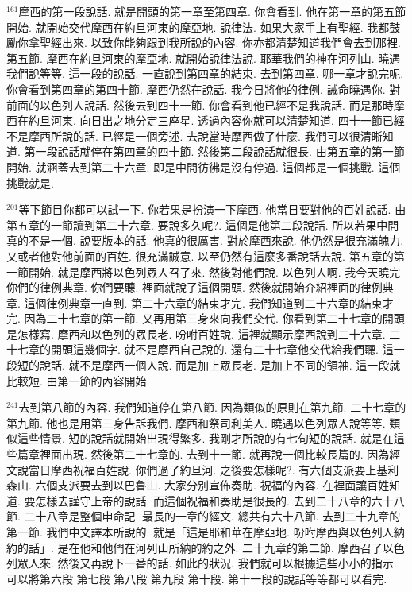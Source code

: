 \documentclass{book}
\begin{document}
$^{161}$摩西的第一段說話.
就是開頭的第一章至第四章.
你會看到.
他在第一章的第五節開始.
就開始交代摩西在約旦河東的摩亞地.
說律法.
如果大家手上有聖經.
我都鼓勵你拿聖經出來.
以致你能夠跟到我所說的內容.
你亦都清楚知道我們會去到那裡.
第五節.
摩西在約旦河東的摩亞地.
就開始說律法說.
耶華我們的神在河列山.
曉遇我們說等等.
這一段的說話.
一直說到第四章的結束.
去到第四章.
哪一章才說完呢.
你會看到第四章的第四十節.
摩西仍然在說話.
我今日將他的律例.
誡命曉遇你.
對前面的以色列人說話.
然後去到四十一節.
你會看到他已經不是我說話.
而是那時摩西在約旦河東.
向日出之地分定三座星.
透過內容你就可以清楚知道.
四十一節已經不是摩西所說的話.
已經是一個旁述.
去說當時摩西做了什麼.
我們可以很清晰知道.
第一段說話就停在第四章的四十節.
然後第二段說話就很長.
由第五章的第一節開始.
就涵蓋去到第二十六章.
即是中間彷彿是沒有停過.
這個都是一個挑戰.
這個挑戰就是.

$^{201}$等下節目你都可以試一下.
你若果是扮演一下摩西.
他當日要對他的百姓說話.
由第五章的一節讀到第二十六章.
要說多久呢?.
這個是他第二段說話.
所以若果中間真的不是一個.
說要版本的話.
他真的很厲害.
對於摩西來說.
他仍然是很充滿魄力.
又或者他對他前面的百姓.
很充滿誠意.
以至仍然有這麼多番說話去說.
第五章的第一節開始.
就是摩西將以色列眾人召了來.
然後對他們說.
以色列人啊.
我今天曉完你們的律例典章.
你們要聽.
裡面就說了這個開頭.
然後就開始介紹裡面的律例典章.
這個律例典章一直到.
第二十六章的結束才完.
我們知道到二十六章的結束才完.
因為二十七章的第一節.
又再用第三身來向我們交代.
你看到第二十七章的開頭是怎樣寫.
摩西和以色列的眾長老.
吩咐百姓說.
這裡就顯示摩西說到二十六章.
二十七章的開頭這幾個字.
就不是摩西自己說的.
還有二十七章他交代給我們聽.
這一段短的說話.
就不是摩西一個人說.
而是加上眾長老.
是加上不同的領袖.
這一段就比較短.
由第一節的內容開始.

$^{241}$去到第八節的內容.
我們知道停在第八節.
因為類似的原則在第九節.
二十七章的第九節.
他也是用第三身告訴我們.
摩西和祭司利美人.
曉遇以色列眾人說等等.
類似這些情景.
短的說話就開始出現得繁多.
我剛才所說的有七句短的說話.
就是在這些篇章裡面出現.
然後第二十七章的.
去到十一節.
就再說一個比較長篇的.
因為經文說當日摩西祝福百姓說.
你們過了約旦河.
之後要怎樣呢?.
有六個支派要上基利森山.
六個支派要去到以巴魯山.
大家分別宣佈奏助.
祝福的內容.
在裡面讓百姓知道.
要怎樣去謹守上帝的說話.
而這個祝福和奏助是很長的.
去到二十八章的六十八節.
二十八章是整個申命記.
最長的一章的經文.
總共有六十八節.
去到二十九章的第一節.
我們中文譯本所說的.
就是「這是耶和華在摩亞地.
吩咐摩西與以色列人納約的話」.
是在他和他們在河列山所納的約之外.
二十九章的第二節.
摩西召了以色列眾人來.
然後又再說下一番的話.
如此的狀況.
我們就可以根據這些小小的指示.
可以將第六段 第七段 第八段 第九段 第十段.
第十一段的說話等等都可以看完.
\end{document}
